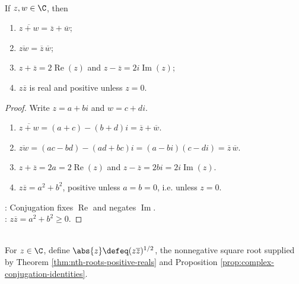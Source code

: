 \begin{proposition} \label{prop:complex-conjugation-identities} \\
If $z,w\in\C$, then
\begin{enumerate}[label=(\roman*)]
\setlength{\itemsep}{0pt}
\item $\overline{z+w}=\overline{z}+\overline{w}$;
\item $\overline{zw}=\overline{z}\,\overline{w}$;
\item $z+\overline{z}=2\operatorname{Re}(z)$ and $z-\overline{z}=2i\operatorname{Im}(z)$;
\item $z\overline{z}$ is real and positive unless $z=0$.
\end{enumerate}
\begin{proof}
Write $z=a+bi$ and $w=c+di$.
\begin{enumerate}[label=(\roman*)]
\setlength{\itemsep}{0pt}
\item $\overline{z+w}=(a+c)-(b+d)i=\overline{z}+\overline{w}$.
\item $\overline{zw}=(ac-bd)-(ad+bc)i=(a-bi)(c-di)=\overline{z}\,\overline{w}$.
\item $z+\overline{z}=2a=2\operatorname{Re}(z)$ and $z-\overline{z}=2bi=2i\operatorname{Im}(z)$.
\item $z\overline{z}=a^2+b^2$, positive unless $a=b=0$, i.e. unless $z=0$.
\end{enumerate}
: Conjugation fixes $\operatorname{Re}$ and negates $\operatorname{Im}$.\\
: $z\overline{z}=a^2+b^2\geq0$.
\end{proof}
\end{proposition}

\begin{definition} \label{def:complex-absolute-value-analysis} \\
For $z\in\C$, define $\abs{z}\defeq(z\overline{z})^{1/2}$, the nonnegative square root supplied by Theorem \ref{thm:nth-roots-positive-reals} and Proposition \ref{prop:complex-conjugation-identities}.
\end{definition}

